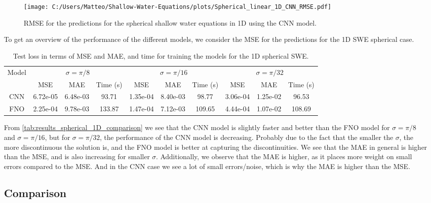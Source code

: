 \begin{figure}[H]
    \centering
    \texttt{[image: C:/Users/Matteo/Shallow-Water-Equations/plots/Spherical\_linear\_1D\_CNN\_RMSE.pdf]}
    \caption{RMSE for the predictions for the spherical shallow water equations in 1D using the CNN model.}\label{fig:Spherical_linear_1D_CNN_RMSE}
\end{figure}

To get an overview of the performance of the different models, we consider the MSE for the predictions for the 1D SWE spherical case.
\begin{table}[H]
    \centering
    \small %
    \begin{tabular}{c|ccc|ccc|ccc}
        \hline
        Model & \multicolumn{3}{c|}{$\sigma = \pi/8$} & \multicolumn{3}{c|}{$\sigma = \pi/16$} & \multicolumn{3}{c}{$\sigma = \pi/32$} \\
        \cline{2-10}
        & MSE & MAE & Time (s) & MSE & MAE & Time (s) & MSE & MAE & Time (s) \\
        \hline
        CNN & 6.72e-05 & 6.48e-03 & 93.71 & 1.35e-04 & 8.40e-03 & 98.77 & 3.06e-04 & 1.25e-02 & 96.53 \\ 
        \hline
        FNO & 2.25e-04 & 9.78e-03 & 133.87 & 1.47e-04 & 7.12e-03 & 109.65 & 4.44e-04 & 1.07e-02 & 108.69 \\ 
        \hline
    \end{tabular}
    \caption{Test loss in terms of MSE and MAE, and time for training the models for the 1D spherical SWE.}\label{tab:results_spherical_1D_comparison}
\end{table}
From \autoref{tab:results_spherical_1D_comparison} we see that the CNN model is slightly faster and better than the FNO model for $\sigma = \pi/8$ and $\sigma = \pi/16$, but for $\sigma = \pi/32$, the performance of the CNN model is decreasing.
Probably due to the fact that the smaller the $\sigma$, the more discontinuous the solution is, and the FNO model is better at capturing the discontinuities.
We see that the MAE in general is higher than the MSE, and is also increasing for smaller $\sigma$.
Additionally, we observe that the MAE is higher, as it places more weight on small errors compared to the MSE.
And in the CNN case we see a lot of small errors/noise, which is why the MAE is higher than the MSE.

\subsection{Comparison}




